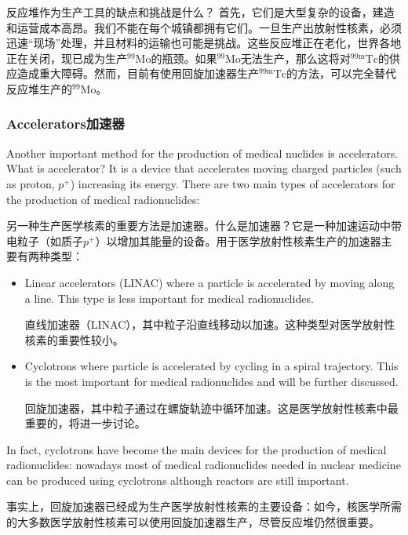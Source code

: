 \documentclass[dvipsnames, svgnames,a4paper,11pt]{article}
\begin{document}
反应堆作为生产工具的缺点和挑战是什么？
首先，它们是大型复杂的设备，建造和运营成本高昂。我们不能在每个城镇都拥有它们。一旦生产出放射性核素，必须迅速“现场”处理，并且材料的运输也可能是挑战。这些反应堆正在老化，世界各地正在关闭，现已成为生产${}^\text{99}\text{Mo}$的瓶颈。如果${}^\text{99}\text{Mo}$无法生产，那么这将对${}^\text{99m}\text{Tc}$的供应造成重大障碍。然而，目前有使用回旋加速器生产${}^\text{99m}\text{Tc}$的方法，可以完全替代反应堆生产的${}^\text{99}\text{Mo}$。


\subsubsection{Accelerators加速器}

Another important method for the production of medical nuclides is accelerators. What is accelerator? It is a device that accelerates moving charged particles (such as proton, $p^+$) increasing its energy. There are two main types of accelerators for the production of medical radionuclides:

另一种生产医学核素的重要方法是加速器。什么是加速器？它是一种加速运动中带电粒子（如质子$p^+$）以增加其能量的设备。用于医学放射性核素生产的加速器主要有两种类型：

\begin{itemize}
\item Linear accelerators (LINAC) where a particle is accelerated by moving along a line. This type is less important for medical radionuclides.  
      
直线加速器（LINAC），其中粒子沿直线移动以加速。这种类型对医学放射性核素的重要性较小。  

\item Cyclotrons where particle is accelerated by cycling in a spiral trajectory. This is the most important for medical radionuclides and will be further discussed.
      
回旋加速器，其中粒子通过在螺旋轨迹中循环加速。这是医学放射性核素中最重要的，将进一步讨论。

\end{itemize}

In fact, cyclotrons have become the main devices for the production of medical radionuclides: nowadays most of medical radionuclides needed in nuclear medicine can be produced using cyclotrons although reactors are still important.

事实上，回旋加速器已经成为生产医学放射性核素的主要设备：如今，核医学所需的大多数医学放射性核素可以使用回旋加速器生产，尽管反应堆仍然很重要。
\end{document}
